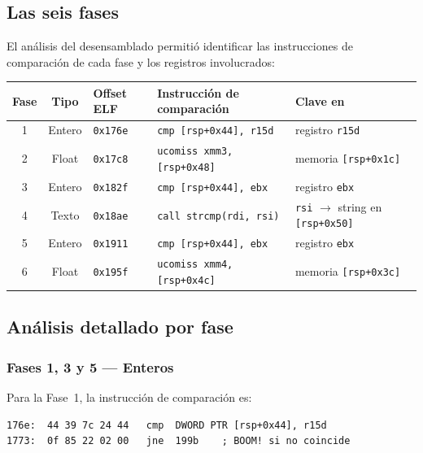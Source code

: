 \documentclass[10pt,a4paper]{article}
\begin{document}
\subsection{Las seis fases}

El análisis del desensamblado permitió identificar las instrucciones de comparación de cada fase y los registros involucrados:

\begin{center}
\begin{tabular}{cclll}
\toprule
\textbf{Fase} & \textbf{Tipo} & \textbf{Offset ELF} & \textbf{Instrucción de comparación} & \textbf{Clave en} \\
\midrule
1 & Entero & \texttt{0x176e} & \texttt{cmp [rsp+0x44], r15d}         & registro \texttt{r15d} \\
2 & Float  & \texttt{0x17c8} & \texttt{ucomiss xmm3, [rsp+0x48]}    & memoria \texttt{[rsp+0x1c]} \\
3 & Entero & \texttt{0x182f} & \texttt{cmp [rsp+0x44], ebx}          & registro \texttt{ebx} \\
4 & Texto  & \texttt{0x18ae} & \texttt{call strcmp(rdi, rsi)}         & \texttt{rsi} $\to$ string en \texttt{[rsp+0x50]} \\
5 & Entero & \texttt{0x1911} & \texttt{cmp [rsp+0x44], ebx}          & registro \texttt{ebx} \\
6 & Float  & \texttt{0x195f} & \texttt{ucomiss xmm4, [rsp+0x4c]}    & memoria \texttt{[rsp+0x3c]} \\
\bottomrule
\end{tabular}
\end{center}

\subsection{Análisis detallado por fase}

\subsubsection*{Fases 1, 3 y 5 — Enteros}

Para la Fase~1, la instrucción de comparación es:

\begin{lstlisting}[style=asmstyle, caption={Comparacion de entero --- Fase 1 (offset 0x176e)}]
176e:  44 39 7c 24 44   cmp  DWORD PTR [rsp+0x44], r15d
1773:  0f 85 22 02 00   jne  199b    ; BOOM! si no coincide
\end{lstlisting}
\end{document}
